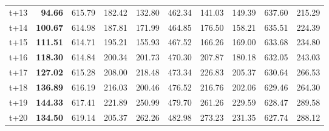 \begin{table}[H]
\begin{tabular}{lrrrrrrrrr}
t+13  & \textbf{94.66}  & 615.79  & 182.42  & 132.80  & 462.34  & 141.03  & 149.39  & 637.60  & 215.29  \\
t+14  & \textbf{100.67}  & 614.98  & 187.81  & 171.99  & 464.85  & 176.50  & 158.21  & 635.51  & 224.39  \\
t+15  & \textbf{111.51}  & 614.71  & 195.21  & 155.93  & 467.52  & 166.26  & 169.00  & 633.68  & 234.80  \\
t+16  & \textbf{118.30}  & 614.84  & 200.34  & 201.73  & 470.30  & 207.87  & 180.18  & 632.05  & 243.03  \\
t+17  & \textbf{127.02}  & 615.28  & 208.00  & 218.48  & 473.34  & 226.83  & 205.37  & 630.64  & 266.53  \\
t+18  & \textbf{136.89}  & 616.19  & 216.03  & 200.46  & 476.52  & 216.76  & 202.06  & 629.46  & 264.30  \\
t+19  & \textbf{144.33}  & 617.41  & 221.89  & 250.99  & 479.70  & 261.26  & 229.59  & 628.47  & 289.58  \\
t+20  & \textbf{134.50}  & 619.14  & 205.37  & 262.26  & 482.98  & 273.23  & 231.35  & 627.74  & 288.12  \\

\bottomrule
\end{tabular}
\end{table}
